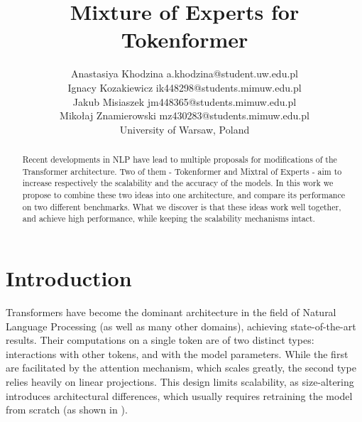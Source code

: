 \documentclass[twoside,11pt]{article}
\begin{document}
\title{Mixture of Experts for Tokenformer
}

\author{\name Anastasiya Khodzina \email a.khodzina@student.uw.edu.pl \\
    \name Ignacy Kozakiewicz \email ik448298@students.mimuw.edu.pl \\
    \name Jakub Misiaszek \email jm448365@students.mimuw.edu.pl \\
    \name Mikołaj Znamierowski \email mz430283@students.mimuw.edu.pl \\
    \addr University of Warsaw, Poland\\
}

\maketitle








\begin{abstract}%
Recent developments in NLP have lead to multiple proposals for modifications of the Transformer architecture. Two of them - Tokenformer and Mixtral of Experts - aim to increase respectively the scalability and the accuracy of the models. In this work we propose to combine these two ideas into one architecture, and compare its performance on two different benchmarks. What we discover is that these ideas work well together, and achieve high performance, while keeping the scalability mechanisms intact.
\end{abstract}






\section{Introduction}

Transformers \cite{Attention_is_all_you_need} have become the dominant architecture in the field of Natural Language Processing (as well as many other domains), achieving state-of-the-art results. Their computations on a single token are of two distinct types: interactions with other tokens, and with the model parameters. While the first are facilitated by the attention mechanism, which scales greatly, the second type relies heavily on linear projections. This design limits scalability, as size-altering introduces architectural differences, which usually requires retraining the model from scratch (as shown in \cite{Scaling}).
\end{document}
